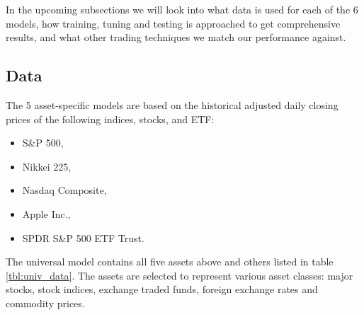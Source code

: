\documentclass[11pt, a4paper]{article}
\begin{document}
In the upcoming subsections we will look into what data is used for each of the 6 models, how training, tuning and testing is approached to get comprehensive results, and what other trading techniques we match our performance against.

\label{sec:DM}
\subsection{Data}
\label{subsec:DM:Data}

The 5 asset-specific models are based on the historical adjusted daily closing prices of the following indices, stocks, and ETF:

\begin{itemize}
    \item S\&P 500,
    \item Nikkei 225,
    \item Nasdaq Composite,
    \item Apple Inc.,
    \item SPDR S\&P 500 ETF Trust.
\end{itemize} 

The universal model contains all five assets above and others listed in table \ref{tbl:univ_data}. The assets are selected to represent various asset classes: major stocks, stock indices, exchange traded funds, foreign exchange rates and commodity prices.
\end{document}
